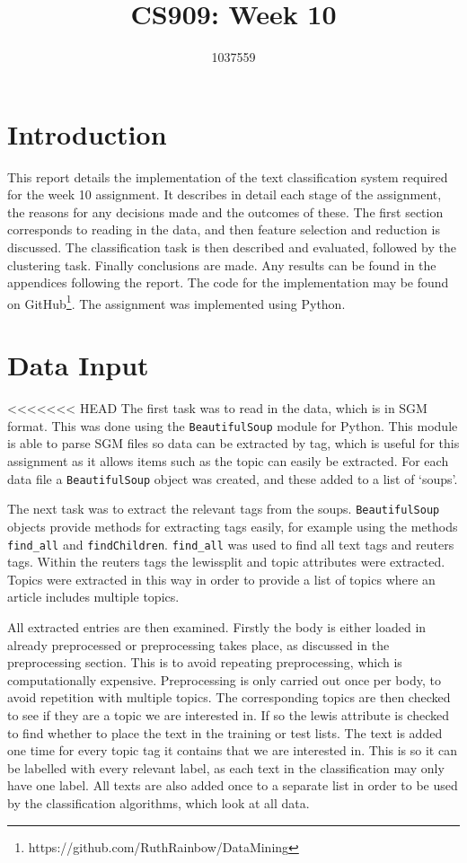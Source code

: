 \documentclass{article}
\title{CS909: Week 10}
\author{1037559}
\date{}
\begin{document}
\maketitle

\section{Introduction}
This report details the implementation of the text classification system required for the week 10 assignment. It describes in detail each stage of the assignment, the reasons for any decisions made and the outcomes of these. The first section corresponds to reading in the data, and then feature selection and reduction is discussed. The classification task is then described and evaluated, followed by the clustering task. Finally conclusions are made. Any results can be found in the appendices following the report. The code for the implementation may be found on GitHub\footnote{https://github.com/RuthRainbow/DataMining}. The assignment was implemented using Python.

\section{Data Input}
<<<<<<< HEAD
The first task was to read in the data, which is in SGM format. This was done using the \verb|BeautifulSoup| module for Python. This module is able to parse SGM files so data can be extracted by tag, which is useful for this assignment as it allows items such as the topic can easily be extracted. For each data file a \verb|BeautifulSoup| object was created, and these added to a list of `soups'.

The next task was to extract the relevant tags from the soups. \verb|BeautifulSoup| objects provide methods for extracting tags easily, for example using the methods \verb|find_all| and \verb|findChildren|. \verb|find_all| was used to find all text tags and reuters tags. Within the reuters tags the lewissplit and topic attributes were extracted. Topics were extracted in this way in order to provide a list of topics where an article includes multiple topics.

All extracted entries are then examined. Firstly the body is either loaded in already preprocessed or preprocessing takes place, as discussed in the preprocessing section. This is to avoid repeating preprocessing, which is computationally expensive. Preprocessing is only carried out once per body, to avoid repetition with multiple topics. The corresponding topics are then checked to see if they are a topic we are interested in. If so the lewis attribute is checked to find whether to place the text in the training or test lists. The text is added one time for every topic tag it contains that we are interested in. This is so it can be labelled with every relevant label, as each text in the classification may only have one label. All texts are also added once to a separate list in order to be used by the classification algorithms, which look at all data.
\end{document}
